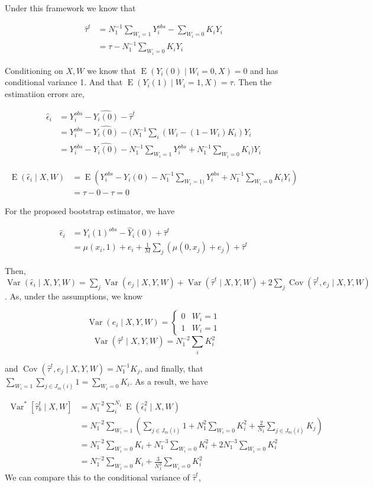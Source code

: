 \documentclass{article}
\DeclareMathOperator{\E}{E}
\DeclareMathOperator{\Var}{Var}
\DeclareMathOperator{\Cov}{Cov}
\newcommand{\hta}{\hat \tau^{t}}
\newcommand{\he}{\hat{\epsilon}_{i}}
\newcommand{\Yi}{Y_{i}^{obs}}
\newcommand{\hYi}{\hat{Y_{i}(0)}}
\begin{document}
Under this framework we know that

\begin{align} \hat \tau^{t} &= N_{1}^{-1}\sum_{W_{i} = 1}Y_{i}^{obs}-\sum_{W_{i} = 0}K_{i}Y_{i} \\
&= \tau -N_{1}^{-1}\sum_{W_{i} = 0}K_{i}Y_{i} \end{align}

Conditioning on $X,W$ we know that $\E(Y_{i}(0) \mid W_{i} = 0, X) = 0$ and has conditional variance 1. And that $\E(Y_{i}(1) \mid W_{i} = 1, X) = \tau$. Then the estimatiion errors are,

\begin{align*} \he &= \Yi - \hYi-\hta \\
&= \Yi - \hYi - (N_{1}^{-1}\sum_{i}(W_{i}-(1-W_{i})K_{i})Y_{i} \\
&= \Yi - \hYi - N_{1}^{-1}\sum_{W_{i} = 1}\Yi+N_{1}^{-1}\sum_{W_{i}=0}K_{i})Y_{i}\end{align*}

\begin{align*}\E(\he \mid X,W) &= \E(\Yi - \hYi - N_{1}^{-1}\sum_{W_{i} =
1)}\Yi+N_{1}^{-1}\sum_{W_{i}=0}K_{i}Y_{i}) \\ &= \tau-0-\tau = 0\end{align*}

For the proposed bootstrap estimator, we have

\begin{align*} \hat \epsilon_{i} &= Y_{i}(1)^{obs}-\hat Y_{i}(0)+\hat \tau^{t} \\
&= \mu(x_{i},1)+e_{i}+\frac{1}{M}\sum_{j}\left(\mu(0,x_{j})+e_{j}\right)+\hat \tau^{t} \end{align*}

Then, $\Var(\he\mid X,Y,W) = \sum_{j}\Var(e_{j}\mid X,Y,W)+\Var(\hat \tau^{t}\mid X,Y,W)+2\sum_{j}\Cov(\hat \tau^{t},e_{j}\mid X,Y,W)$. As, under the assumptions, we know 

$$\Var(e_{i}\mid X,Y,W) = \begin{cases}0 & W_{i} = 1 \\ 1 & W_{i} = 1 \end{cases}$$
$$\Var(\hat \tau^{t} \mid X,Y,W) = N_{1}^{-2}\sum_{i}K_{i}^{2}$$

and $\Cov(\hat \tau^{t},e_{j}\mid X,Y,W) = N_{1}^{-1}K_{j}$, and finally, that $\sum_{W_{i}=1}\sum_{j \in J_{m}(i)}1 = \sum_{W_{i} = 0}K_{i}$. As a result, we have


\begin{align*} \Var^{*}[\hat \tau_{b}^{t} \mid X,W] &= N_{1}^{-2}\sum_{i}^{N_{1}}\E(\he^{2} \mid X,W) \\
&= N_{1}^{-2}\sum_{W_{i}=1}\left(\sum_{j \in J_{m}(i)}1+N_{1}^{2}\sum_{W_{i}=0}K_{i}^{2}+\frac{2}{N_{1}}\sum_{j \in J_{m}(i)}K_{j}\right) \\
&= N_{1}^{-2}\sum_{W_{i}=0}K_{i}+N_{1}^{-3}\sum_{W_{i}=0}K_{i}^{2}+2N_{1}^{-3}\sum_{W_{i}=0}K_{i}^{2} \\
&= N_{1}^{-2}\sum_{W_{i}=0}K_{i}+\frac{3}{N_{1}^{3}}\sum_{W_{i}=0}K_{i}^{2}\end{align*}
 We can compare this to the conditional variance of $\hta$,
\end{document}
